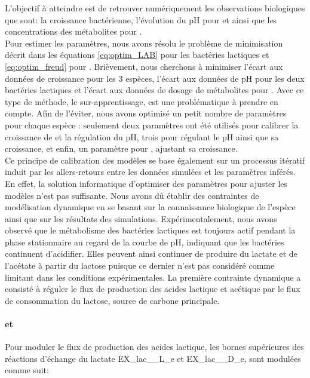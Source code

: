 L'objectif à atteindre est de retrouver numériquement les observations biologiques que sont: la croissance bactérienne,  l'évolution du pH pour \lactis et \plantarum ainsi que les concentrations des métabolites pour \freud. \\

Pour estimer les paramètres, nous avons résolu le problème de minimisation décrit dans les équations \ref{eq:optim_LAB} pour les bactéries lactiques et \ref{eq:optim_freud} pour \freud. Brièvement, nous cherchons à minimiser l'écart aux données de croissance pour les 3 espèces, l'écart aux données de pH pour les deux bactéries lactiques et l'écart aux données de dosage de métabolites pour \freud. Avec ce type de méthode, le sur-apprentissage, est une problématique à prendre en compte. Afin de l'éviter, nous avons optimisé un petit nombre de paramètres pour chaque espèce : seulement deux paramètres ont été utilisés pour calibrer la croissance de \lactis et la régulation du pH, trois pour \plantarum régulant le pH ainsi que sa croissance, et enfin, un paramètre pour \freud, ajustant sa croissance.\\

Ce principe de calibration des modèles se base également sur un processus itératif induit par les allers-retours entre les données simulées et les paramètres inférés. En effet, la solution informatique d'optimiser des paramètres pour ajuster les modèles n'est pas suffisante. Nous avons dû établir des contraintes de modélisation dynamique en se basant sur la connaissance biologique de l'espèce ainsi que sur les résultats des simulations. Expérimentalement, nous avons observé que le métabolisme des bactéries lactiques est toujours actif pendant la phase stationnaire au regard de la courbe de pH, indiquant que les bactéries continuent d'acidifier. Elles peuvent ainsi continuer de produire du lactate et de l'acétate à partir du lactose puisque ce dernier n'est pas considéré comme limitant dans les conditions expérimentales. La première contrainte dynamique a consisté à réguler le flux de production des acides lactique et acétique par le flux de consommation du lactose, source de carbone principale. 

\paragraph*{\lactis et \plantarum}
Pour moduler le flux de production des acides lactique, les bornes supérieures des réactions d'échange du lactate EX\_lac\_\_L\_e et EX\_lac\_\_D\_e, sont modulées comme suit:

